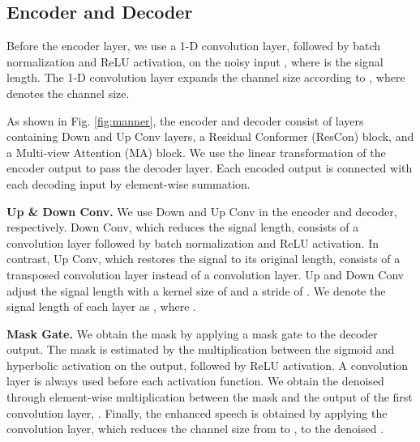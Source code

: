 \documentclass{article}
\begin{document}
\subsection{Encoder and Decoder}
\label{sec:encoder}

Before the encoder layer, we use a 1-D convolution layer, followed by batch normalization and ReLU activation, on the noisy input , where  is the signal length. The 1-D convolution layer expands the channel size according to , where  denotes the channel size.
 
 As shown in Fig. \ref{fig:manner}, the encoder and decoder consist of  layers containing Down and Up Conv layers, a Residual Conformer (ResCon) block, and a Multi-view Attention (MA) block. We use the linear transformation of the encoder output to pass the decoder layer. Each encoded output is connected with each decoding input by element-wise summation.

\noindent \textbf{Up \& Down Conv.} We use Down and Up Conv in the encoder and decoder, respectively. Down Conv, which reduces the signal length, consists of a convolution layer followed by batch normalization and ReLU activation. In contrast, Up Conv, which restores the signal to its original length, consists of a transposed convolution layer instead of a convolution layer. Up and Down Conv adjust the signal length with a kernel size of  and a stride of . We denote the signal length of each layer as , where . 

\noindent \textbf{Mask Gate.} We obtain the mask  by applying a mask gate to the decoder output. The mask is estimated by the multiplication between the sigmoid and hyperbolic activation on the output, followed by ReLU activation. A convolution layer is always used before each activation function. We obtain the denoised  through element-wise multiplication between the mask and the output of the first convolution layer, . Finally, the enhanced speech is obtained by applying the convolution layer, which reduces the channel size from  to , to the denoised .
\end{document}
